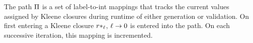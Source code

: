 


The path $\Pi$ is a set of label-to-int mappings that tracks
the current values assigned by Kleene closures during runtime
of either generation or validation.
On first entering a Kleene closure $r*_\ell$,
$\ell \rightarrow 0$ is entered into the path.
On each successive iteration, this mapping is incremented.

